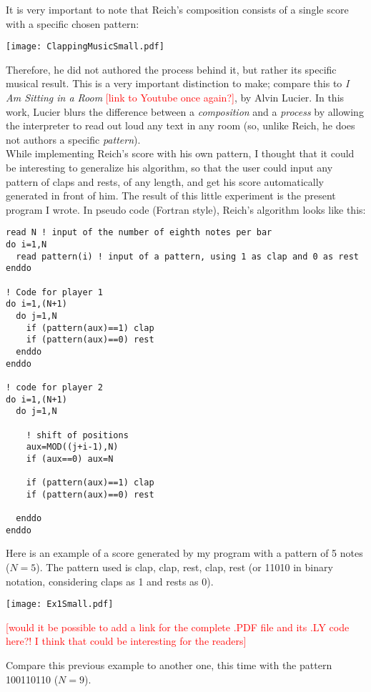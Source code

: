 \documentclass{article}
\begin{document}
It is very important to note that Reich's composition consists of a single score with a specific chosen pattern:

\texttt{[image: ClappingMusicSmall.pdf]}

Therefore, he did not authored the process behind it, but rather its specific musical result. 
This is a very important distinction to make; compare this to \textit{I Am Sitting in a Room}
\textcolor{red}{[link to Youtube once again?]}, by Alvin Lucier. 
In this work, Lucier blurs the difference between a \textit{composition} and a \textit{process} by allowing
the interpreter to read out loud any text in any room (so, unlike Reich, he does not authors a specific
\textit{pattern}). \\

While implementing Reich's score with his own pattern, I thought that it could be interesting to generalize
his algorithm, so that the user could input any  pattern of claps and rests, of any length, and get his score
automatically generated in front of him. 
The result of this little experiment is the present program I wrote. 
In pseudo code (Fortran style), Reich's algorithm looks like this:

\begin{verbatim}
read N ! input of the number of eighth notes per bar
do i=1,N
  read pattern(i) ! input of a pattern, using 1 as clap and 0 as rest
enddo

! Code for player 1
do i=1,(N+1)
  do j=1,N
    if (pattern(aux)==1) clap
    if (pattern(aux)==0) rest
  enddo
enddo

! code for player 2
do i=1,(N+1)
  do j=1,N

    ! shift of positions
    aux=MOD((j+i-1),N)
    if (aux==0) aux=N

    if (pattern(aux)==1) clap
    if (pattern(aux)==0) rest

  enddo
enddo
\end{verbatim}

Here is an example of a score generated by my program with a pattern of 5 notes ($N=5$). 
The pattern used is clap, clap, rest, clap, rest (or 11010 in binary notation, considering claps as 1 and rests
as 0).

\texttt{[image: Ex1Small.pdf]}

\textcolor{red}{[would it be possible to add a link for the complete .PDF file and its .LY code here?!
I think that could be interesting for the readers]}

Compare this previous example to another one, this time with the pattern 100110110 ($N=9$).
\end{document}
